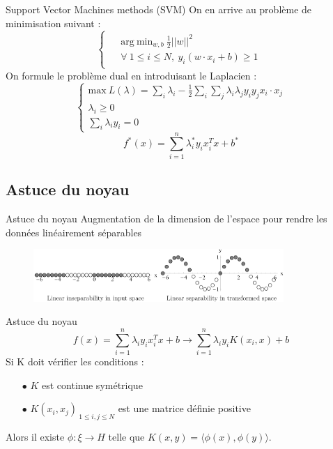 \documentclass{beamer}
\begin{document}
\begin{frame}{Support Vector Machines methods (SVM)}
On en arrive au problème de minimisation suivant : 
\[
	\left\{
	\begin{array}{ccc}		
	\begin{aligned}
		&\text{arg}\ \text{min}_{w,b}\ \frac{1}{2}||w||^{2} \\
		&\forall \ 1 \leqslant i \leqslant N,\ y_i (w \cdot x_i + b)\geqslant 1
	\end{aligned}
\end{array}
	\right.
\]
On formule le problème dual en introduisant le Laplacien :
\[
\left\{
\begin{array}{lll}
	\text{max}\ L(\lambda) = \sum_{i}{\lambda_{i}} - \frac{1}{2} \sum_{i}{\sum_{j}	{\lambda_{i} \lambda_{j} y_i y_j x_i \cdot x_j}} \\
 \lambda_i \geqslant 0 \\
 \sum_{i}\lambda_i y_i = 0 
\end{array}
\right.
\]
\[
	f^* (x) = \sum_{i=1}^n {\lambda^*_i y_i x^T_i x + b^*}
\]
\end{frame}
\subsection{Astuce du noyau}
\begin{frame}{Astuce du noyau}
Augmentation de la dimension de l'espace pour rendre les données linéairement séparables
\begin{figure}[!h]
	\begin{center}
		\includegraphics[height = 2cm, keepaspectratio]{graphes/separation.png}
	\end{center}
\end{figure}
\end{frame}
\begin{frame}{Astuce du noyau}
\[
	f (x) = \sum_{i=1}^n {\lambda_i y_i x^T_i x + b} \rightarrow 
\sum_{i=1}^n {\lambda_i y_i K(x_i,x) + b}
\]
Si K doit vérifier les conditions :
\begin{itemize}
\item[$\bullet$]  $K$ est continue symétrique 
\item[$\bullet$]  $K(x_i,x_j)_{\ 1 \leqslant i,j \leqslant N}$ est une matrice définie positive
\end{itemize}
 Alors il existe $\phi :\xi \rightarrow H$ telle que $K(x,y) = \langle\phi(x),\phi(y)\rangle$.
\end{frame}
\end{document}
